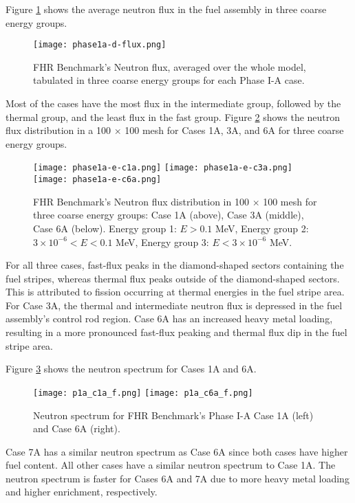 Figure \ref{fig:phase1a-d} shows the average neutron flux in the fuel assembly in 
three coarse energy groups. 
\begin{figure}[]
    \centering
    \texttt{[image: phase1a-d-flux.png]} 
    \caption{\acrlong{FHR} Benchmark's Neutron flux, averaged over the whole 
    model, tabulated in three coarse energy groups for each Phase I-A case. }
    \label{fig:phase1a-d}
\end{figure}
Most of the cases have the most flux in the intermediate group, followed by 
the thermal group, and the least flux in the fast group.    
Figure \ref{fig:phase1a-e} shows the neutron flux distribution in a 100 $\times$ 
100 mesh for Cases 1A, 3A, and 6A for three coarse energy groups. 
\begin{figure}[]
    \centering
    \texttt{[image: phase1a-e-c1a.png]} 
    \texttt{[image: phase1a-e-c3a.png]} 
    \texttt{[image: phase1a-e-c6a.png]} 
    \caption{\acrlong{FHR} Benchmark's Neutron flux distribution in 100 
    $\times$ 100 mesh for three coarse energy groups: Case 1A (above), Case 3A 
    (middle), Case 6A (below). Energy group 1: $E > 0.1$ MeV, Energy group 2: 
    $3 \times 10^{-6} < E < 0.1$ MeV, Energy group 3: $E < 3 \times 10^{-6}$ MeV. }
    \label{fig:phase1a-e}
\end{figure}
For all three cases, fast-flux peaks in the diamond-shaped sectors containing 
the fuel stripes, whereas thermal flux peaks outside of the diamond-shaped 
sectors. 
This is attributed to fission occurring at thermal energies in the 
fuel stripe area. 
For Case 3A, the thermal and intermediate neutron flux is depressed in the fuel 
assembly's control rod region.  
Case 6A has an increased heavy metal loading, resulting in a more pronounced 
fast-flux peaking and thermal flux dip in the fuel stripe area. 

Figure \ref{fig:phase1a-f} shows the neutron spectrum for Cases 1A and 6A. 
\begin{figure}[]
    \centering
    \texttt{[image: p1a\_c1a\_f.png]} 
    \texttt{[image: p1a\_c6a\_f.png]} 
    \caption{Neutron spectrum for \acrlong{FHR} Benchmark's Phase I-A Case 1A 
    (left) and Case 6A (right).}
    \label{fig:phase1a-f}
\end{figure}
Case 7A has a similar neutron spectrum as Case 6A since both cases have 
higher fuel content. 
All other cases have a similar neutron spectrum to Case 1A.
The neutron spectrum is faster for Cases 6A and 7A due to more heavy metal 
loading and higher enrichment, respectively.  

